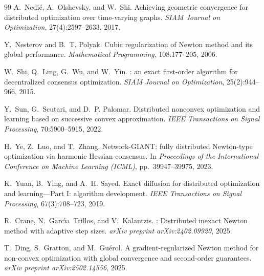 \documentclass[10pt,twocolumn,letterpaper]{article}
\theoremstyle{compact}
\theoremstyle{compactremark}
\begin{document}
{\begin{thebibliography}{99}
		A.~Nedi{\'c}, A.~Olshevsky, and W.~Shi.
		\newblock Achieving geometric convergence for distributed optimization over time-varying graphs.
		\newblock \emph{SIAM Journal on Optimization}, 27(4):2597--2633, 2017.
		
		Y.~Nesterov and B.~T. Polyak.
		\newblock Cubic regularization of {N}ewton method and its global performance.
		\newblock \emph{Mathematical Programming}, 108:177--205, 2006.
		
		W.~Shi, Q.~Ling, G.~Wu, and W.~Yin.
		: an exact first-order algorithm for decentralized consensus optimization.
		\newblock \emph{SIAM Journal on Optimization}, 25(2):944--966, 2015.
		
		Y.~Sun, G.~Scutari, and D.~P. Palomar.
		\newblock Distributed nonconvex optimization and learning based on successive convex approximation.
		\newblock \emph{IEEE Transactions on Signal Processing}, 70:5900--5915, 2022.
		
		H.~Ye, Z.~Luo, and T.~Zhang.
		\newblock Network-{GIANT}: fully distributed {N}ewton-type optimization via harmonic Hessian consensus.
		\newblock In \emph{Proceedings of the International Conference on Machine Learning (ICML)}, pp.~39947--39975, 2023.
		
		K.~Yuan, B.~Ying, and A.~H. Sayed.
		\newblock Exact diffusion for distributed optimization and learning---Part {I}: algorithm development.
		\newblock \emph{IEEE Transactions on Signal Processing}, 67(3):708--723, 2019.
		
		
		R.~Crane, N.~Garc\'{\i}a~Trillos, and V.~Kalantzis.
		: Distributed inexact {N}ewton method with adaptive step sizes.
		\newblock \emph{arXiv preprint arXiv:2402.09920}, 2025.
		
		T.~Ding, S.~Gratton, and M.~Gu\'erol.
		\newblock A gradient-regularized {N}ewton method for non-convex optimization with global convergence and second-order guarantees.
		\newblock \emph{arXiv preprint arXiv:2502.14556}, 2025.
		

\end{thebibliography}}
\end{document}
